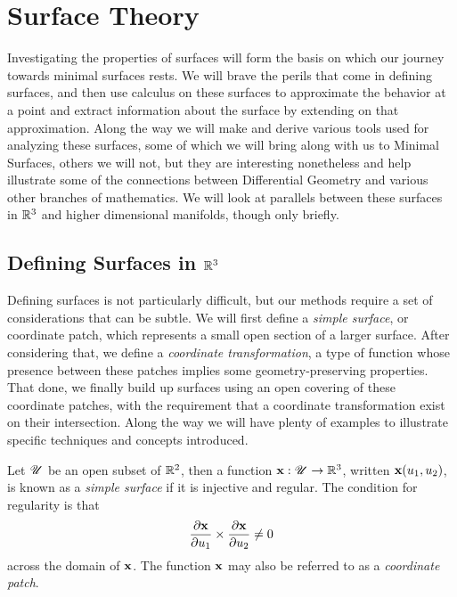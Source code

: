 \section{Surface Theory}

Investigating the properties of surfaces will form the basis on which our journey towards minimal surfaces rests. We will brave the perils that come in defining surfaces, and then use calculus on these surfaces to approximate the behavior at a point and extract information about the surface by extending on that approximation. Along the way we will make and derive various tools used for analyzing these surfaces, some of which we will bring along with us to Minimal Surfaces, others we will not, but they are interesting nonetheless and help illustrate some of the connections between Differential Geometry and various other branches of mathematics. We will look at parallels between these surfaces in $\mathbb{R}^3$ and higher dimensional manifolds, though only briefly.

\subsection{Defining Surfaces in $\mathbb{R}^3$}

Defining surfaces is not particularly difficult, but our methods require a set of considerations that can be subtle. We will first define a \emph{simple surface}, or coordinate patch, which represents a small open section of a larger surface. After considering that, we define a \emph{coordinate transformation}, a type of function whose presence between these patches implies some geometry-preserving properties. That done, we finally build up surfaces using an open covering of these coordinate patches, with the requirement that a coordinate transformation exist on their intersection. Along the way we will have plenty of examples to illustrate specific techniques and concepts introduced.

\begin{defn}
  Let $\mathscr{U}$ be an open subset of $\mathbb{R}^2$, then a function $\mathbf{x}: \mathscr{U} \to \mathbb{R}^3$, written $\mathbf{x}(u_1, u_2)$, is known as a \emph{simple surface} if it is injective and regular. The condition for regularity is that
  \[
    \frac{\partial\mathbf{x}}{\partial u_1} \times \frac{\partial\mathbf{x}}{\partial u_2} \neq 0
  \]
  across the domain of $\mathbf{x}$. The function $\mathbf{x}$ may also be referred to as a \emph{coordinate patch}.
\end{defn}

